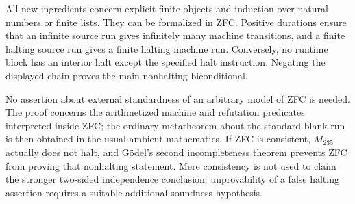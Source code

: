 All new ingredients concern explicit finite objects and induction over
natural numbers or finite lists. They can be formalized in ZFC. Positive
durations ensure that an infinite source run gives infinitely many
machine transitions, and a finite halting source run gives a finite
halting machine run. Conversely, no runtime block has an interior halt
except the specified halt instruction. Negating the displayed chain
proves the main nonhalting biconditional.

No assertion about external standardness of an arbitrary model of ZFC
is needed. The proof concerns the arithmetized machine and refutation
predicates interpreted inside ZFC; the ordinary metatheorem about the
standard blank run is then obtained in the usual ambient mathematics.
If ZFC is consistent, $M_{235}$ actually does not halt, and G\"odel's
second incompleteness theorem prevents ZFC from proving that
nonhalting statement. Mere consistency is not used to claim the stronger
two-sided independence conclusion: unprovability of a false halting
assertion requires a suitable additional soundness hypothesis.
